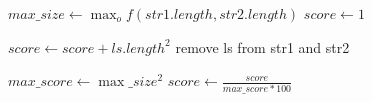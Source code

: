 \begin{algorithmic}

\State $max\_size \gets \max_of(str1.length, str2.length)$
\State $score \gets 1$

	\State $score \gets score + ls.length^2 $
	\State remove ls from str1 and str2
\EndWhile

\State $max\_score \gets \max\_size^2$
\State $score \gets \frac{score}{max\_score * 100} $

\EndFunction
\end{algorithmic}